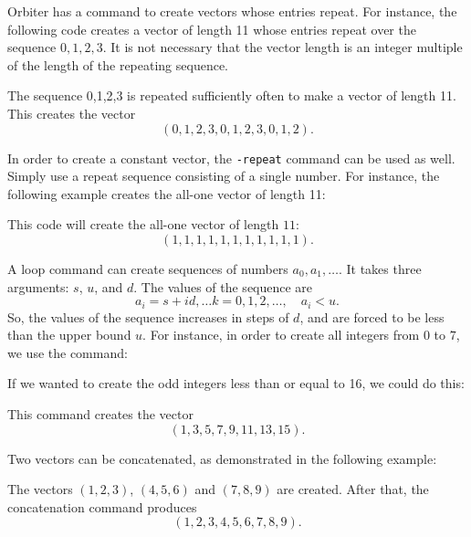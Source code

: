 

\bigskip




Orbiter has a command to create vectors whose entries repeat. 
For instance, the following code creates a vector of length 11 
whose entries repeat over the sequence $0,1,2,3$. 
It is not necessary that the vector length is an 
integer multiple of the length of the repeating sequence.


The sequence 0,1,2,3 is repeated sufficiently 
often to make a vector of length 11. 
This creates the vector 
$$
( 0, 1, 2, 3, 0, 1, 2, 3, 0, 1, 2 ).
$$

\bigskip

In order to create a constant vector, 
the \verb'-repeat' command can be used as well. 
Simply use a repeat sequence consisting of a single number. 
For instance,  the following example creates the all-one vector of length 11:


This code will create the all-one vector of length $11$:
$$
( 1, 1, 1, 1, 1, 1, 1, 1, 1, 1, 1 ).
$$

\bigskip


A loop command can create sequences of numbers $a_0,a_1,\ldots$.
It takes three arguments: $s$, $u$, and $d.$ 
The values of the sequence are 
$$
a_i = s + id, \ldots k = 0,1,2,\ldots, \quad a_i < u.
$$
So, the values of the sequence increases in steps of $d$, 
and are forced to be less than the upper bound $u$.
For instance, in order to create all integers from $0$ to $7$, we use the command:


If we wanted to create the odd integers less 
than or equal to 16, we could do this:


This command creates the vector 
$$
( 1, 3, 5, 7, 9, 11, 13, 15 ).
$$


\bigskip


Two vectors can be concatenated, 
as demonstrated in the following example:


The vectors $(1,2,3)$,  $(4,5,6)$ and $(7,8,9)$ are created. 
After that, the concatenation command produces 
$$(1,2,3,4,5,6,7,8,9).$$


\bigskip

